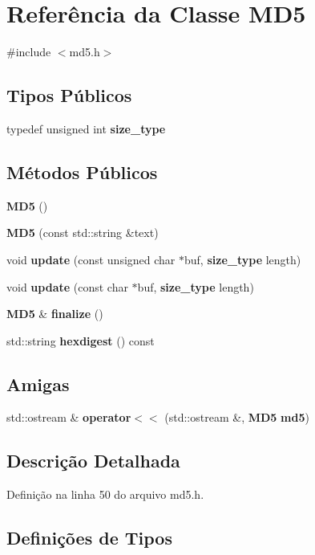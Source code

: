 \section{Referência da Classe M\+D5}
\label{class_m_d5}


{\ttfamily \#include $<$md5.\+h$>$}

\subsection*{Tipos Públicos}
\begin{DoxyCompactItemize}
\item 
typedef unsigned int {\bf size\+\_\+type}
\end{DoxyCompactItemize}
\subsection*{Métodos Públicos}
\begin{DoxyCompactItemize}
\item 
{\bf M\+D5} ()
\item 
{\bf M\+D5} (const std\+::string \&text)
\item 
void {\bf update} (const unsigned char $\ast$buf, {\bf size\+\_\+type} length)
\item 
void {\bf update} (const char $\ast$buf, {\bf size\+\_\+type} length)
\item 
{\bf M\+D5} \& {\bf finalize} ()
\item 
std\+::string {\bf hexdigest} () const 
\end{DoxyCompactItemize}
\subsection*{Amigas}
\begin{DoxyCompactItemize}
\item 
std\+::ostream \& {\bf operator$<$$<$} (std\+::ostream \&, {\bf M\+D5} {\bf md5})
\end{DoxyCompactItemize}


\subsection{Descrição Detalhada}


Definição na linha 50 do arquivo md5.\+h.



\subsection{Definições de Tipos}
